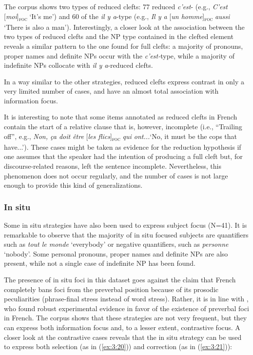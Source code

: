 {The corpus shows two types of reduced clefts: 77 reduced \textit{c'est}- (e.g., \textit{C'est} [{\textit{moi}}]\textsubscript{\textsc{foc}} \normalsize `It's me') and 60 of the \textit{il y a}-type (e.g., \textit{Il y a} [{\textit{un homme}}]\textsubscript{\textsc{foc}} \normalsize \textit{aussi} `There is also a man'). Interestingly, a closer look at the association between the two types of reduced clefts and the NP type contained in the clefted element reveals a similar pattern to the one found for full clefts: a majority of pronouns, proper names and definite NPs occur with the \textit{c'est-}type, while a majority of indefinite NPs collocate with \textit{il y a}-reduced clefts.

In a way similar to the other strategies, reduced clefts express contrast in only a very limited number of cases, and have an almost total association with information focus. 

It is interesting to note that some items annotated as reduced clefts in French contain the start of a relative clause that is, however, incomplete (i.e., ``Trailing off'', e.g., \textit{Non, ça doit être}  [{\textit{les flics}}]\textsubscript{\textsc{foc}} \normalsize \textit{qui ont...}`No, it must be the cops that have...'). These cases might be taken as evidence for the reduction hypothesis \parencite{jenkins2017cleft} if one assumes that the speaker had the intention of producing a full cleft but, for discourse-related reasons, left the sentence incomplete. Nevertheless, this phenomenon does not occur regularly, and the number of cases is not large enough to provide this kind of generalizations.

\subsubsection{\textbf{In situ}} \label{sub:4.6.1.3}

Some in situ strategies have also been used to express subject focus (N=41). It is remarkable to observe that the majority of in situ focused subjects are quantifiers such as \textit{tout le monde} `everybody' or negative quantifiers, such as \textit{personne} `nobody'. Some personal pronouns, proper names and definite NPs are also present, while not a single case of indefinite NP has been found. 

The presence of in situ foci in this dataset goes against the claim that French completely bans foci from the preverbal position \parencite[492]{lambrecht2001framework} because of its prosodic peculiarities (phrase-final stress instead of word stress). Rather, it is in line with \textcite{fery2001focus}, who found robust experimental evidence in favor of the existence of preverbal foci in French. The corpus shows that these strategies are not very frequent, but they can express both information focus
and, to a lesser extent, contrastive focus. A closer look at the contrastive cases reveals that the in situ strategy can be used to express both selection (as in (\ref{ex:3:20})) and correction (as in (\ref{ex:3:21})):

}
